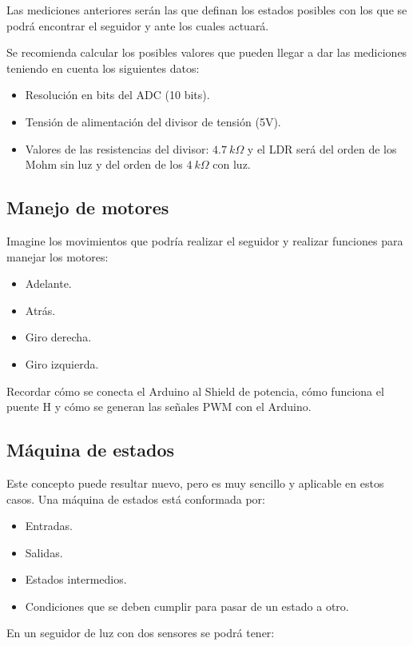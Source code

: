 \documentclass[a4paper,10pt]{article}
\begin{document}
Las mediciones anteriores serán las que definan los estados posibles con los que se podrá encontrar el seguidor y ante los cuales actuará.

Se recomienda calcular los posibles valores que pueden llegar a dar las mediciones teniendo en cuenta los siguientes datos:
\begin{itemize}
	\item Resolución en bits del ADC (10 bits).
	\item Tensión de alimentación del divisor de tensión (5V).
	\item Valores de las resistencias del divisor: $4.7\ k\Omega$ y el LDR será del orden de los Mohm sin luz y del orden de los $4\ k\Omega$ con luz.
\end{itemize}

\subsection*{Manejo de motores}

Imagine los movimientos que podría realizar el seguidor y realizar funciones para manejar los motores:
\begin{itemize}
	\item Adelante.
	\item Atrás.
	\item Giro derecha.
	\item Giro izquierda.
\end{itemize}

Recordar cómo se conecta el Arduino al Shield de potencia, cómo funciona el puente H y cómo se generan las señales PWM con el Arduino.

\subsection*{Máquina de estados}

Este concepto puede resultar nuevo, pero es muy sencillo y aplicable en estos casos.
Una máquina de estados está conformada por:
\begin{itemize}
	\item Entradas.
	\item Salidas.
	\item Estados intermedios.
	\item Condiciones que se deben cumplir para pasar de un estado a otro.
\end{itemize}

En un seguidor de luz con dos sensores se podrá tener:
\end{document}
